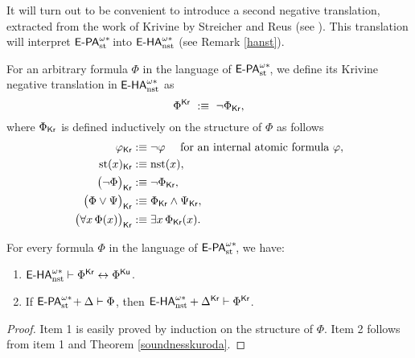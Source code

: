 It will turn out to be convenient to introduce a second negative translation, extracted from the work of Krivine by Streicher and Reus (see \cite{krivine90, streicherreus98, streicherkohlenbach07}). This translation will interpret $\epaststar$ into $\ehanststar$ (see Remark \ref{hanst}).

\begin{dfn}
For an arbitrary formula $\Phi$ in the language of $\epaststar$, we define its Krivine negative translation in $\ehanststar$ as
\[
\Phi^\kr\ :\equiv\ \neg\Phi_\kr,
\]
where $\Phi_\kr$ is defined inductively on the structure of $\Phi$ as follows
\begin{align*}
 \phi_\kr   &:\equiv \neg\phi\quad \text { for an internal atomic formula $\phi$}, \\
 \st(x)_\kr  &:\equiv \nst(x), \\
 \big(\neg\Phi\big)_\kr  &:\equiv \neg\Phi_\kr,\\
 \big(\Phi\vee\Psi\big)_\kr  &:\equiv \Phi_\kr\wedge \Psi_\kr,\\
 \big(\forall x \, \Phi(x)\big)_\kr  &:\equiv  \exists x \, \Phi_\kr(x).\\
\end{align*}
\end{dfn}

\begin{thm}\label{l:kukr}
For every formula $\Phi$ in the language of $\epaststar$, we have:
\begin{enumerate}
\item $\ehanststar\vdash\Phi^\kr\leftrightarrow\Phi^\ku$.
\item If $\epaststar + \Delta \vdash \Phi$, then $\ehanststar + \Delta ^\kr \vdash \Phi^\kr$.
\end{enumerate}
\end{thm}
\begin{proof}
Item 1 is easily proved by induction on the structure of $\Phi$. Item 2 follows from item 1 and Theorem \ref{soundnesskuroda}.
\end{proof}
